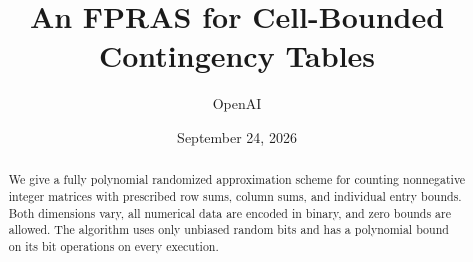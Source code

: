 \documentclass[11pt]{article}
\title{An FPRAS for Cell-Bounded Contingency Tables}
\author{OpenAI}
\date{September 24, 2026}
\theoremstyle{definition}
\theoremstyle{remark}
\begin{document}
\maketitle
\begin{abstract}
We give a fully polynomial randomized approximation scheme for counting
nonnegative integer matrices with prescribed row sums, column sums, and
individual entry bounds. Both dimensions vary, all numerical data are encoded
in binary, and zero bounds are allowed. The algorithm uses only unbiased random
bits and has a polynomial bound on its bit operations on every execution.
\end{abstract}








\clearpage
{}
{}


\end{document}
